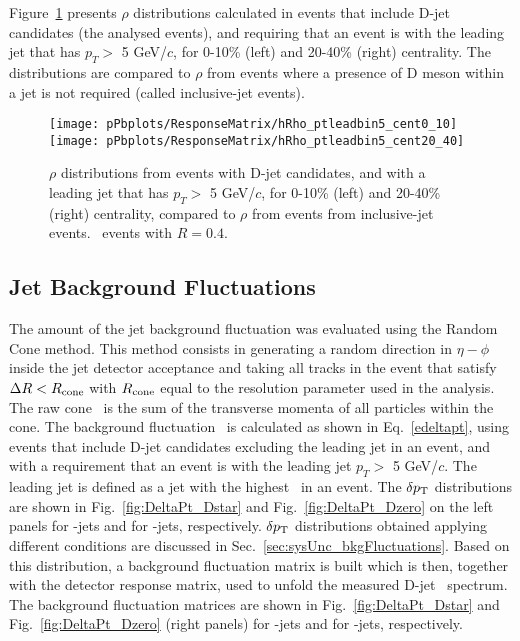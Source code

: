 Figure~\ref{fig:rho_Dstar} presents $\rho$ distributions calculated in events that include D-jet candidates (the analysed events), and requiring that an event is with the leading jet that has $p_{T}>$ 5 GeV/$c$, for 0-10\% (left) and 20-40\% (right) centrality. The distributions are compared to $\rho$ from events where a presence of D meson within a jet is not required (called inclusive-jet events).

\begin{figure}[bth]
\centering
\texttt{[image: pPbplots/ResponseMatrix/hRho\_ptleadbin5\_cent0\_10]}
\texttt{[image: pPbplots/ResponseMatrix/hRho\_ptleadbin5\_cent20\_40]}
\caption{$\rho$ distributions from events with D-jet candidates, and with a leading jet that has $p_{T}>$ 5 GeV/$c$, for 0-10\% (left) and 20-40\% (right) centrality, compared to $\rho$ from events from inclusive-jet events. \pPb\ events with $R=0.4$.}
\label{fig:rho_Dstar}
\end{figure}

\subsection{Jet Background Fluctuations}
\label{sec:BackFluc}
The amount of the jet background fluctuation was evaluated using the Random Cone method.
This method consists in generating a random direction in $\eta-\phi$ inside the jet detector acceptance and 
taking all tracks in the event that satisfy $\Delta R<R_{\rm cone}$ with $R_{\rm cone}$ equal to the resolution parameter used in the analysis. 
The raw cone \pt\ is the sum of the transverse momenta of all particles within the cone.
The background fluctuation \deltapt\ is calculated as shown in Eq.~\ref{edeltapt}, using events that include D-jet candidates excluding the leading jet in an event, and with a requirement that an event is with the leading jet $p_{T}>$ 5 GeV/$c$. The leading jet is defined as a jet with the highest \pt\ in an event.
The $\delta p_{\rm T}$ distributions are shown in Fig.~\ref{fig:DeltaPt_Dstar} and Fig.~\ref{fig:DeltaPt_Dzero} on the left panels for \Dstar-jets and for \Dzero-jets, respectively. 
$\delta p_{\rm T}$ distributions obtained applying different conditions are discussed in Sec.~\ref{sec:sysUnc_bkgFluctuations}.
Based on this distribution, a background fluctuation matrix is built which is then, together with the detector response matrix, used to unfold the measured D-jet \pt\ spectrum. 
The background fluctuation matrices are shown in Fig.~\ref{fig:DeltaPt_Dstar} and Fig.~\ref{fig:DeltaPt_Dzero} (right panels) for \Dstar-jets and for \Dzero-jets, respectively. 

